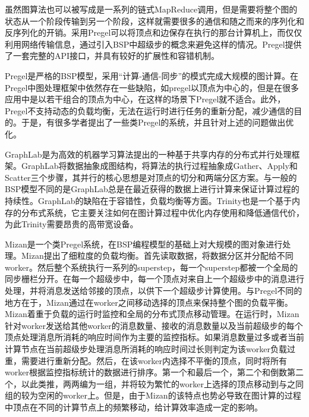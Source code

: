 虽然图算法也可以被写成是一系列的链式MapReduce调用，但是需要将整个图的状态从一个阶段传输到另一个阶段，这样就需要很多的通信和随之而来的序列化和反序列化的开销。采用Pregel可以将顶点和边保存在执行的那台计算机上，而仅仅利用网络传输信息，通过引入BSP中超级步的概念来避免这样的情况。Pregel提供了一套完整的API接口，并具有较好的扩展性和容错机制。

Pregel是严格的BSP模型，采用“计算-通信-同步”的模式完成大规模的图计算。在Pregel中图处理框架中依然存在一些缺陷，如pregel以顶点为中心的，但是在很多应用中是以若干组合的顶点为中心，在这样的场景下Pregel就不适合。此外，Pregel不支持动态的负载均衡，无法在运行时进行任务的重新分配，减少通信的目的。于是，有很多学者提出了一些类Pregel的系统，并且针对上述的问题做出优化。

GraphLab\cite{low2010graphlab}是为高效的机器学习算法提出的一种基于共享内存的分布式并行处理框架。GraphLab将数据抽象成图结构，将算法的执行过程抽象成Gather、Apply和Scatter三个步骤，其并行的核心思想是对顶点的切分和两端分区方案。与一般的BSP模型不同的是GraphLab总是在最近获得的数据上进行计算来保证计算过程的持续性。GraphLab的缺陷在于容错性，负载均衡等方面。Trinity\cite{}也是一个基于内存的分布式系统，它主要关注如何在图计算过程中优化内存使用和降低通信代价，为此Trinity需要昂贵的高带宽设备。

Mizan\cite{khayyat2013mizan}是一个类Pregel系统，在BSP编程模型的基础上对大规模的图对象进行处理。Mizan提出了细粒度的负载均衡。首先读取数据，将数据分区并分配给不同worker。然后整个系统执行一系列的superstep，每一个superstep都被一个全局的同步栅栏分开。在每一个超级步中，每一个顶点对来自上一个超级步中的消息进行处理，并将消息发送给邻接的顶点，以供下一个超级步计算使用。与Pregel不同的地方在于，Mizan通过在worker之间移动选择的顶点来保持整个图的负载平衡。Mizan着重于负载的运行时监控和全局的分布式顶点移动管理。在运行时，Mizan针对worker发送给其他worker的消息数量、接收的消息数量以及当前超级步的每个顶点处理消息所消耗的响应时间作为主要的监控指标。如果消息数量过多或者当前计算节点在当前超级步处理消息所消耗的响应时间过长则判定为该worker负载过重，需要进行重新分配。然后，在该worker内选择不平衡的顶点，同时将所有worker根据监控指标统计的数据进行排序。第一个和最后一个，第二个和倒数第二个，以此类推，两两编为一组，并将较为繁忙的worker上选择的顶点移动到与之同组的较为空闲的worker上。但是，由于Mizan的该特点也势必导致在图计算的过程中顶点在不同的计算节点上的频繁移动，给计算效率造成一定的影响。

